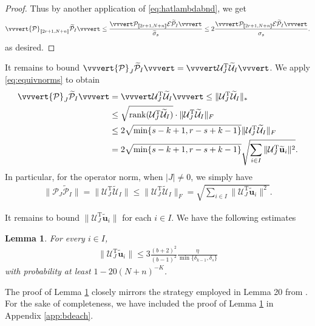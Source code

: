 \documentclass[reqno]{amsart}
\DeclareMathOperator{\rank}{rank}
\newcommand{\T}{\mathrm{T}}
\theoremstyle{plain}
\newtheorem{lemma}[theorem]{Lemma}
\theoremstyle{definition}
\begin{document}
\begin{proof}
Thus by another application of \eqref{eq:hatlambdabnd}, we get
\begin{align}\label{eq:conclusionbd1}
\vvvert {\mathcal P}_{\llbracket 2r+1, N+n\rrbracket}  \widetilde{\mathcal P}_I \vvvert \le \frac{\vvvert  \mathcal P_{\llbracket 2r+1, N+n\rrbracket} \mathcal E \widetilde{\mathcal P}_I \vvvert}{\widetilde{\sigma}_{s}} \le 2 \frac{\vvvert  \mathcal P_{\llbracket 2r+1, N+n\rrbracket} \mathcal E \widetilde{\mathcal P}_I \vvvert}{{\sigma}_{s}}.
\end{align}
as desired.  
\end{proof}

It remains to bound $ \vvvert {\mathcal P}_J  \widetilde{\mathcal P}_I \vvvert =  \vvvert \mathcal{U}_J^\T  \widetilde{\mathcal U}_I \vvvert$. We apply \eqref{eq:equivnorms} to obtain
\begin{align}\label{eq:2ndtermub}
\vvvert {\mathcal P}_J  \widetilde{\mathcal P}_I \vvvert &=  \vvvert \mathcal{U}_J^\T  \widetilde{\mathcal U}_I \vvvert \le \|\mathcal{U}_J^\T  \widetilde{\mathcal U}_I\|_* \nonumber\\
&\le \sqrt{\rank(\mathcal{U}_J^\T  \widetilde{\mathcal U}_I)}\cdot \|\mathcal{U}_J^\T  \widetilde{\mathcal U}_I\|_F \nonumber\\
&\le 2\sqrt{\min\{s-k+1,r-s+k-1\}} \|\mathcal{U}_J^\T  \widetilde{\mathcal U}_I\|_F\nonumber \\
&= 2\sqrt{\min\{s-k+1,r-s+k-1\}} \sqrt{\sum_{i\in I}  \| \mathcal U_J^\T \widetilde{\mathbf u}_i \|^2}.
\end{align}
In particular, for the operator norm, when $|J|\neq 0$, we simply have
\begin{align}\label{eq:2ndterm-operator}
\|{\mathcal P}_J  \widetilde{\mathcal P}_I\| = \|\mathcal{U}_J^\T  \widetilde{\mathcal U}_I\|\le \|\mathcal{U}_J^\T  \widetilde{\mathcal U}_I\|_F = \sqrt{\sum_{i\in I}  \| \mathcal U_J^\T \widetilde{\mathbf u}_i \|^2}.
\end{align}

It remains to bound $\| \mathcal U_J^\T \widetilde{\mathbf u}_i \|$ for each $i\in I$. %
We have the following estimates
\begin{lemma}\label{lem:projsv}For every $i\in I$, 
\begin{align}\label{lem:bdeach-new}
 \| \mathcal U_J^\T \widetilde{\mathbf u}_i \| \le 3 \frac{(b+2)^2}{(b-1)^2} \frac{\eta}{\min\{\delta_{k-1}, \delta_s\}}
\end{align}
with probability at least $1-20(N+n)^{-K}$.
\end{lemma}
The proof of Lemma \ref{lem:projsv} closely mirrors the strategy employed in Lemma 20 from \cite{OVW22}. For the sake of completeness, we have included the proof of Lemma \ref{lem:projsv} in Appendix \ref{app:bdeach}.
 
\end{document}
